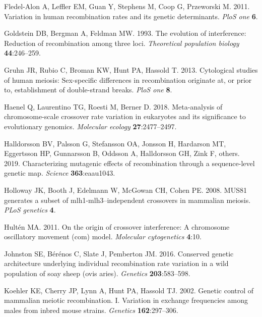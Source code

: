 \documentclass[
]{article}
\begin{document}
\leavevmode\hypertarget{ref-fledel2011}{}%
Fledel-Alon A, Leffler EM, Guan Y, Stephens M, Coop G, Przeworski M.
2011. Variation in human recombination rates and its genetic
determinants. \emph{PloS one} \textbf{6}.

\leavevmode\hypertarget{ref-goldstein1993}{}%
Goldstein DB, Bergman A, Feldman MW. 1993. The evolution of
interference: Reduction of recombination among three loci.
\emph{Theoretical population biology} \textbf{44}:246--259.

\leavevmode\hypertarget{ref-gruhn2013}{}%
Gruhn JR, Rubio C, Broman KW, Hunt PA, Hassold T. 2013. Cytological
studies of human meiosis: Sex-specific differences in recombination
originate at, or prior to, establishment of double-strand breaks.
\emph{PloS one} \textbf{8}.

\leavevmode\hypertarget{ref-haenel2018}{}%
Haenel Q, Laurentino TG, Roesti M, Berner D. 2018. Meta-analysis of
chromosome-scale crossover rate variation in eukaryotes and its
significance to evolutionary genomics. \emph{Molecular ecology}
\textbf{27}:2477--2497.

\leavevmode\hypertarget{ref-halldorsson2019}{}%
Halldorsson BV, Palsson G, Stefansson OA, Jonsson H, Hardarson MT,
Eggertsson HP, Gunnarsson B, Oddsson A, Halldorsson GH, Zink F, others.
2019. Characterizing mutagenic effects of recombination through a
sequence-level genetic map. \emph{Science} \textbf{363}:eaau1043.

\leavevmode\hypertarget{ref-holloway2008mus81}{}%
Holloway JK, Booth J, Edelmann W, McGowan CH, Cohen PE. 2008. MUS81
generates a subset of mlh1-mlh3--independent crossovers in mammalian
meiosis. \emph{PLoS genetics} \textbf{4}.

\leavevmode\hypertarget{ref-hulten2011_COM}{}%
Hultén MA. 2011. On the origin of crossover interference: A chromosome
oscillatory movement (com) model. \emph{Molecular cytogenetics}
\textbf{4}:10.

\leavevmode\hypertarget{ref-johnston2016_soay}{}%
Johnston SE, Bérénos C, Slate J, Pemberton JM. 2016. Conserved genetic
architecture underlying individual recombination rate variation in a
wild population of soay sheep (ovis aries). \emph{Genetics}
\textbf{203}:583--598.

\leavevmode\hypertarget{ref-koehler2002}{}%
Koehler KE, Cherry JP, Lynn A, Hunt PA, Hassold TJ. 2002. Genetic
control of mammalian meiotic recombination. I. Variation in exchange
frequencies among males from inbred mouse strains. \emph{Genetics}
\textbf{162}:297--306.
\end{document}
